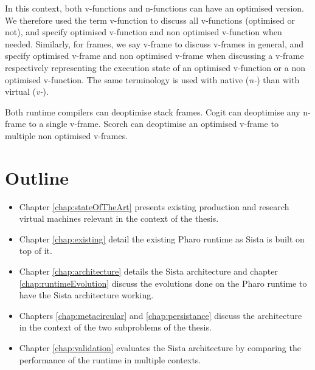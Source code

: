 \documentclass[a4paper,12pt,twoside]{../includes/ThesisStyle}
\begin{document}
In this context, both v-functions and n-functions can have an optimised version. We therefore used the term v-function to discuss all v-functions (optimised or not), and specify optimised v-function and non optimised v-function when needed. Similarly, for frames, we say v-frame to discuss v-frames in general, and specify optimised v-frame and non optimised v-frame when discussing a v-frame respectively representing the execution state of an optimised v-function or a non optimised v-function. The same terminology is used with native (\emph{n-}) than with virtual (\emph{v-}).

Both runtime compilers can deoptimise stack frames. Cogit can deoptimise any n-frame to a single v-frame. 
Scorch can deoptimise an optimised v-frame to multiple non optimised v-frames. 

\section{Outline}

\begin{itemize}
	\item Chapter \ref{chap:stateOfTheArt} presents existing production and research virtual machines relevant in the context of the thesis. 
	\item Chapter \ref{chap:existing} detail the existing Pharo runtime as Sista is built on top of it.
	\item Chapter \ref{chap:architecture} details the Sista architecture and chapter \ref{chap:runtimeEvolution} discuss the evolutions done on the Pharo runtime to have the Sista architecture working.
	\item Chapters \ref{chap:metacircular} and \ref{chap:persistance} 
	discuss the architecture in the context of the two subproblems of the thesis. 
	\item Chapter \ref{chap:validation} evaluates the Sista architecture by comparing the performance of the runtime in multiple contexts.
\end{itemize}



\ifx\wholebook\relax\else
    
\end{document}
